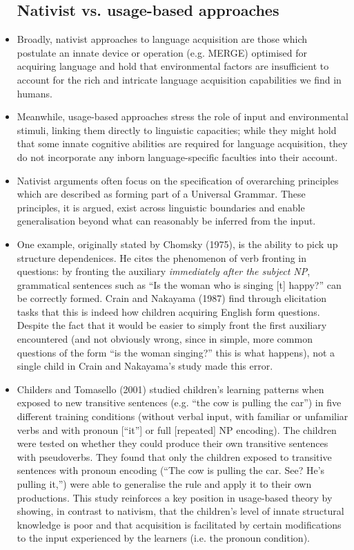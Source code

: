\documentclass{article}
\begin{document}
\begin{itemize}
\subsection{Nativist vs. usage-based approaches}
    \item Broadly, nativist approaches to language acquisition are those which postulate an innate device or operation (e.g. MERGE) optimised for acquiring language and hold that environmental factors are insufficient to account for the rich and intricate language acquisition capabilities we find in humans. 
    \item Meanwhile, usage-based approaches stress the role of input and environmental stimuli, linking them directly to linguistic capacities; while they might hold that some innate cognitive abilities are required for language acquisition, they do not incorporate any inborn language-specific faculties into their account. 
    \item Nativist arguments often focus on the specification of overarching principles which are described as forming part of a Universal Grammar. These principles, it is argued, exist across linguistic boundaries and enable generalisation beyond what can reasonably be inferred from the input. 
    \item One example, originally stated by Chomsky (1975), is the ability to pick up structure dependenices. He cites the phenomenon of verb fronting in questions: by fronting the auxiliary \textit{immediately after the subject NP}, grammatical sentences such as “Is the woman who is singing [t] happy?” can be correctly formed. Crain and Nakayama (1987) find through elicitation tasks that this is indeed how children acquiring English form questions. Despite the fact that it would be easier to simply front the first auxiliary encountered (and not obviously wrong, since in simple, more common questions of the form  “is the woman singing?” this is what happens), not a single child in Crain and Nakayama’s study made this error.
    \item Childers and Tomasello (2001) studied children’s learning patterns when exposed to new transitive sentences (e.g. “the cow is pulling the car”) in five different training conditions (without verbal input, with familiar or unfamiliar verbs and with pronoun [“it”] or full [repeated] NP encoding). The children were tested on whether they could produce their own transitive sentences with pseudoverbs. They found that only the children exposed to transitive sentences with pronoun encoding (“The cow is pulling the car. See? He’s pulling it,”) were able to generalise the rule and apply it to their own productions. This study reinforces a key position in usage-based theory by showing, in contrast to nativism, that the children’s level of innate structural knowledge is poor and that acquisition is facilitated by certain modifications to the input experienced by the learners (i.e. the pronoun condition). 

\end{itemize}
\end{document}
